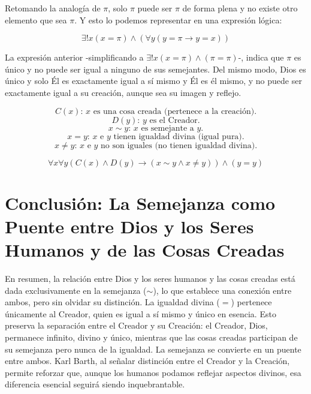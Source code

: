 \documentclass[letterpaper,13pt]{article}
\begin{document}
Retomando la analogía de $\pi$, solo $\pi$ puede ser $\pi$ de forma plena y no existe otro elemento que sea $\pi$. Y esto lo podemos representar en una expresión lógica:

\[
\exists!x \left( x = \pi \right) \land \left( \forall y \left( y = \pi \rightarrow y = x \right) \right)
\]

La expresión anterior -simplificando a $\exists!x \left( x = \pi \right) \land \left( \pi = \pi \right)$-, indica que $\pi$ es único y no puede ser igual a ninguno de sus semejantes. Del mismo modo, Dios es único y solo Él es exactamente igual a sí mismo y Él es él mismo, y no puede ser exactamente igual a su creación, aunque sea su imagen y reflejo.

\[
C(x): \, x \text{ es una cosa creada (pertenece a la creación).}
\]
\[
D(y): \, y \text{ es el Creador.}
\]
\[
x \sim y: \, x \text{ es semejante a } y.
\]
\[
x = y: \, x \text{ e } y \text{ tienen igualdad divina (igual pura).}
\]
\[
x \neq y: \, x \text{ e } y \text{ no son iguales (no tienen igualdad divina).}
\]

\[
\forall x \forall y \left( C(x) \land D(y) \rightarrow (x \sim y \land x \neq y) \right) \land (y = y)
\]

\section{Conclusión: La Semejanza como Puente entre Dios y los Seres Humanos y de las Cosas Creadas}

En resumen, la relación entre Dios y los seres humanos y las cosas creadas está dada exclusivamente en la semejanza ($\sim$), lo que establece una conexión entre ambos, pero sin olvidar su distinción. La igualdad divina ($=$) pertenece únicamente al Creador, quien es igual a sí mismo y único en esencia. Esto preserva la separación entre el Creador y su Creación: el Creador, Dios, permanece infinito, divino y único, mientras que las cosas creadas participan de su semejanza pero nunca de la igualdad. La semejanza se convierte en un puente entre ambos. Karl Barth, al señalar distinción entre el Creador y la Creación, permite reforzar que, aunque los humanos podamos reflejar aspectos divinos, esa diferencia esencial seguirá siendo inquebrantable.
\end{document}
